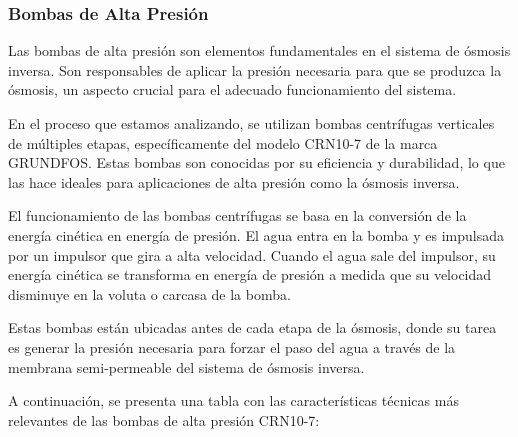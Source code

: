 \subsubsection{Bombas de Alta Presión}

Las bombas de alta presión son elementos fundamentales en el sistema de ósmosis inversa. Son responsables de aplicar la presión necesaria para que se produzca la ósmosis, un aspecto crucial para el adecuado funcionamiento del sistema.

En el proceso que estamos analizando, se utilizan bombas centrífugas verticales de múltiples etapas, específicamente del modelo CRN10-7 de la marca GRUNDFOS. Estas bombas son conocidas por su eficiencia y durabilidad, lo que las hace ideales para aplicaciones de alta presión como la ósmosis inversa.

El funcionamiento de las bombas centrífugas se basa en la conversión de la energía cinética en energía de presión. El agua entra en la bomba y es impulsada por un impulsor que gira a alta velocidad. Cuando el agua sale del impulsor, su energía cinética se transforma en energía de presión a medida que su velocidad disminuye en la voluta o carcasa de la bomba.

Estas bombas están ubicadas antes de cada etapa de la ósmosis, donde su tarea es generar la presión necesaria para forzar el paso del agua a través de la membrana semi-permeable del sistema de ósmosis inversa.



A continuación, se presenta una tabla con las características técnicas más relevantes de las bombas de alta presión CRN10-7:\\

